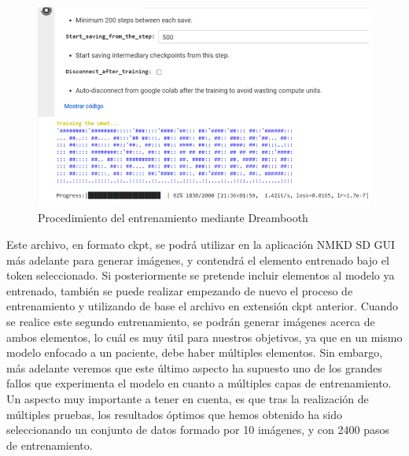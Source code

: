 \begin{figure}[h]
	\centering
	\includegraphics[width = 1
	\textwidth]{Imagenes/Vectorial/dreambooth.png}
	\caption{Procedimiento del entrenamiento mediante Dreambooth}
	\label{fig:dreambooth}
\end{figure}

Este archivo, en formato ckpt, se podrá utilizar en la aplicación NMKD SD GUI más adelante para generar imágenes, y contendrá el elemento entrenado bajo el token seleccionado. Si posteriormente se pretende incluir elementos al modelo ya entrenado, también se puede realizar empezando de nuevo el proceso de entrenamiento y utilizando de base el archivo en extensión ckpt anterior. Cuando se realice este segundo entrenamiento, se podrán generar imágenes acerca de ambos elementos, lo cuál es muy útil para nuestros objetivos, ya que en un mismo modelo enfocado a un paciente, debe haber múltiples elementos. Sin embargo, más adelante veremos que este último aspecto ha supuesto uno de los grandes fallos que experimenta el modelo en cuanto a múltiples capas de entrenamiento. \\

Un aspecto muy importante a tener en cuenta, es que tras la realización de múltiples pruebas, los resultados óptimos que hemos obtenido ha sido seleccionando un conjunto de datos formado por 10 imágenes, y con 2400 pasos de entrenamiento. 



